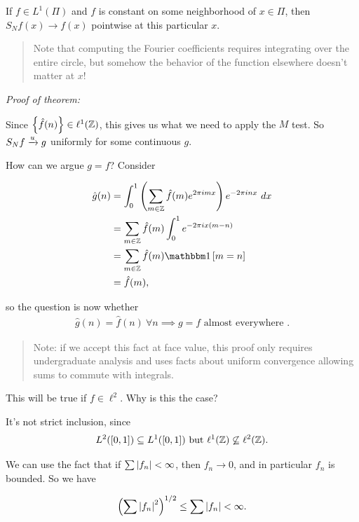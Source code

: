 If \(f\in L^1(\Pi)\) and \(f\) is constant on some neighborhood of
\(x \in \Pi\), then \(S_Nf(x) \to f(x)\) pointwise at this particular
\(x\).

\begin{quote}
Note that computing the Fourier coefficients requires integrating over
the entire circle, but somehow the behavior of the function elsewhere
doesn't matter at \(x\)!
\end{quote}

\emph{Proof of theorem:}

Since \(\left\{{\hat{f}(n)}\right\} \in \ell^1({\mathbb{Z}})\), this gives us what we
need to apply the \(M\) test. So \(S_Nf \xrightarrow{u} g\) uniformly for
some continuous \(g\).

How can we argue \(g = f\)? Consider

\begin{align*}
\hat{g}(n) 
&= \int_0^1 \left( \sum_{m\in \ZZ} \hat{f}(m) e^{2\pi i m x} \right) e^{-2\pi i n x} ~dx \\
&= \sum_{m\in \ZZ} \hat{f}(m) \int_0^1 e^{-2\pi i x (m-n)} \\
&= \sum_{m\in \ZZ} \hat{f}(m) \indic{m = n} \\
&= \hat{f}(m)
,\end{align*}

so the question is now whether
\begin{align*}
\hat{g}(n) = \hat{f}(n) ~\forall n \implies g = f \text{ almost everywhere }.
\end{align*}

\begin{quote}
Note: if we accept this fact at face value, this proof only requires
undergraduate analysis and uses facts about uniform convergence allowing
sums to commute with integrals.
\end{quote}

This will be true if \(f \in \ell^2\). Why is this the case?

It's not strict inclusion, since
\begin{align*}
L^2([0, 1]) \subseteq L^1([0, 1]) \text{ but } \ell^1({\mathbb{Z}}) \not\subseteq \ell^2({\mathbb{Z}})
.\end{align*}

We can use the fact that if \(\sum {\left\lvert {f_n} \right\rvert} < \infty\), then
\(f_n \to 0\), and in particular \(f_n\) is bounded. So we have

\begin{align*}
\left( \sum {\left\lvert {f_n} \right\rvert}^2 \right)^{1/2} \leq \sum {\left\lvert {f_n} \right\rvert} < \infty
.\end{align*}


